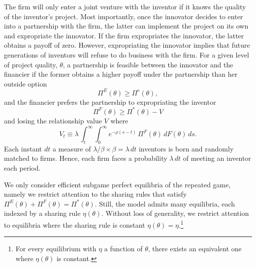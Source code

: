 \documentclass[12pt]{article}
\begin{document}
The firm will only enter a joint venture with the inventor if it knows the quality of the inventor's project. Most importantly, once the innovator decides to enter into a partnership with the firm, the latter can implement the project on its own and expropriate the innovator. If the firm expropriates the innovator, the latter obtains a payoff of zero. However, expropriating the innovator implies that future generations of inventors will refuse to do business with the firm. For a given level of project quality, $\theta$, a partnership is feasible between the innovator and the financier if the former obtains a higher payoff under the partnership than her outside option
\begin{equation}\label{eq:IR}
\Pi^E(\theta)\geq\Pi^c(\theta),
\end{equation}
and the financier prefers the partnership to expropriating the inventor
\begin{equation}\label{eq:IC}
\Pi^F(\theta) \geq \Pi^*(\theta) - V
\end{equation}
 and losing the relationship value $V$ where
\begin{equation}\label{eqn:V}
V_t \equiv  \lambda \, \int_t^\infty \int_0^\infty e^{-\rho(s-t)} \,\Pi^F(\theta) \,  d F(\theta) \, ds.
\end{equation}
Each instant $dt$ a measure of $\lambda/\beta \times \beta = \lambda\,dt$ inventors is born and randomly matched to firms. Hence, each firm faces a probability $\lambda\,dt$ of meeting an inventor each period.



We only consider efficient subgame perfect equilibria of the repeated game, namely we  restrict attention to the sharing rules that satisfy $\Pi^E(\theta) + \Pi^F(\theta) = \Pi^*(\theta)$. Still, the model admits many equilibria, each indexed by a sharing rule $\eta(\theta)$. Without loss of generality, we restrict attention to equilibria where the sharing rule is constant $\eta(\theta) = \eta$.\footnote{For every equilibrium with $\eta$ a function of $\theta$, there exists an equivalent one where $\eta(\theta)$ is constant.}
\end{document}
